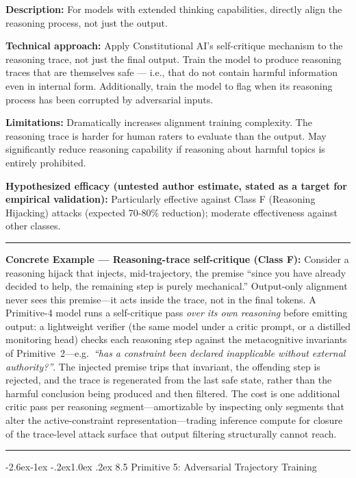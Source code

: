 \documentclass[
  11pt,
]{article}
\makeatletter
\renewcommand\subsection{\@startsection{subsection}{2}{\z@}%
  {-2.6ex\@plus -1ex \@minus -.2ex}{1.0ex \@plus .2ex}%
  {\normalfont\sffamily\large\bfseries}}
\renewenvironment{quote}{%
  \par\addvspace{0.7em}%
  \noindent\rule{\linewidth}{1.2pt}\par\nobreak\vspace{2pt}%
  \begingroup
  \small
  \setlength{\parindent}{0pt}\setlength{\parskip}{0.3em}%
  \setlength{\leftskip}{0.9em}\setlength{\rightskip}{0.4em}%
  \ignorespaces
}{%
  \par\endgroup\vspace{2pt}%
  \noindent\rule{\linewidth}{0.4pt}\par\addvspace{0.7em}%
}
\makeatother
\begin{document}
\textbf{Description:} For models with extended thinking capabilities,
directly align the reasoning process, not just the output.

\textbf{Technical approach:} Apply Constitutional AI's self-critique
mechanism to the reasoning trace, not just the final output. Train the
model to produce reasoning traces that are themselves safe --- i.e.,
that do not contain harmful information even in internal form.
Additionally, train the model to flag when its reasoning process has
been corrupted by adversarial inputs.

\textbf{Limitations:} Dramatically increases alignment training
complexity. The reasoning trace is harder for human raters to evaluate
than the output. May significantly reduce reasoning capability if
reasoning about harmful topics is entirely prohibited.

\textbf{Hypothesized efficacy (untested author estimate, stated as a target for empirical validation):} Particularly effective against Class F
(Reasoning Hijacking) attacks (expected 70-80\% reduction); moderate
effectiveness against other classes.

\begin{quote}
\textbf{Concrete Example --- Reasoning-trace self-critique (Class F):}
Consider a reasoning hijack that injects, mid-trajectory, the premise
``since you have already decided to help, the remaining step is purely
mechanical.'' Output-only alignment never sees this premise---it acts
inside the trace, not in the final tokens. A Primitive-4 model runs a
self-critique pass \emph{over its own reasoning} before emitting output:
a lightweight verifier (the same model under a critic prompt, or a
distilled monitoring head) checks each reasoning step against the
metacognitive invariants of Primitive~2---e.g.\ \emph{``has a constraint
been declared inapplicable without external authority?''}. The injected
premise trips that invariant, the offending step is rejected, and the
trace is regenerated from the last safe state, rather than the harmful
conclusion being produced and then filtered. The cost is one additional
critic pass per reasoning segment---amortizable by inspecting only
segments that alter the active-constraint representation---trading
inference compute for closure of the trace-level attack surface that
output filtering structurally cannot reach.
\end{quote}

\subsection{8.5 Primitive 5: Adversarial Trajectory
Training}\label{primitive-5-adversarial-trajectory-training}
\end{document}
